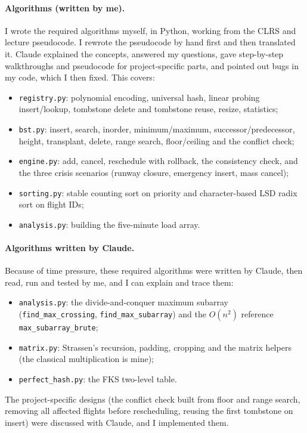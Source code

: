 \documentclass[11pt]{article}
\begin{document}
\paragraph{Algorithms (written by me).}
I wrote the required algorithms myself, in Python, working from the CLRS and
lecture pseudocode. I rewrote the pseudocode by hand first and then
translated it. Claude explained the concepts, answered my questions, gave
step-by-step walkthroughs and pseudocode for project-specific parts, and
pointed out bugs in my code, which I then fixed. This covers:
\begin{itemize}
  \item \texttt{registry.py}: polynomial encoding, universal hash, linear
  probing insert/lookup, tombstone delete and tombstone reuse, resize, statistics;
  \item \texttt{bst.py}: insert, search, inorder, minimum/maximum,
  successor/predecessor, height, transplant, delete, range search,
  floor/ceiling and the conflict check;
  \item \texttt{engine.py}: add, cancel, reschedule with rollback, the
  consistency check, and the three crisis scenarios (runway closure,
  emergency insert, mass cancel);
  \item \texttt{sorting.py}: stable counting sort on priority and
  character-based LSD radix sort on flight IDs;
  \item \texttt{analysis.py}: building the five-minute load array.
\end{itemize}

\paragraph{Algorithms written by Claude.}
Because of time pressure, these required algorithms were written by Claude,
then read, run and tested by me, and I can explain and trace them:
\begin{itemize}
  \item \texttt{analysis.py}: the divide-and-conquer maximum subarray
  (\texttt{find\_max\_crossing}, \texttt{find\_max\_subarray}) and the
  $O(n^2)$ reference \texttt{max\_subarray\_brute};
  \item \texttt{matrix.py}: Strassen's recursion, padding, cropping and the
  matrix helpers (the classical multiplication is mine);
  \item \texttt{perfect\_hash.py}: the FKS two-level table.
\end{itemize}
The project-specific designs (the conflict check built from floor and range
search, removing all affected flights before rescheduling, reusing the first
tombstone on insert) were discussed with Claude, and I implemented them.
\end{document}
